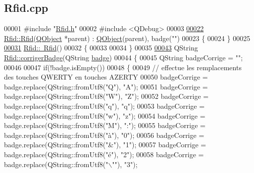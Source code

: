 \hypertarget{_rfid_8cpp_source}{}\subsection{Rfid.\+cpp}
\label{_rfid_8cpp_source}

\begin{DoxyCode}
00001 \textcolor{preprocessor}{#include "\hyperlink{_rfid_8h}{Rfid.h}"}
00002 \textcolor{preprocessor}{#include <QDebug>}
00003 
\hyperlink{class_rfid_aa00c7163ce0e3fda6596353d40a458a9}{00022} \hyperlink{class_rfid_aa00c7163ce0e3fda6596353d40a458a9}{Rfid::Rfid}(\hyperlink{class_q_object}{QObject} *parent) : \hyperlink{class_q_object}{QObject}(parent), badge(\textcolor{stringliteral}{""})
00023 \{
00024 \}
00025 
\hyperlink{class_rfid_a563836053a71a9fdc566a812da0cf5c1}{00031} \hyperlink{class_rfid_a563836053a71a9fdc566a812da0cf5c1}{Rfid::~Rfid}()
00032 \{
00033 
00034 \}
00035 
\hyperlink{class_rfid_afb99366646ac75b7e1d28302d38bf4f2}{00043} QString \hyperlink{class_rfid_afb99366646ac75b7e1d28302d38bf4f2}{Rfid::corrigerBadge}(QString \hyperlink{class_rfid_ac634cd26ffbe1c6da3967dc4af53b734}{badge})
00044 \{
00045     QString badgeCorrige = \textcolor{stringliteral}{""};
00046 
00047     \textcolor{keywordflow}{if}(!badge.isEmpty())
00048     \{
00049         \textcolor{comment}{// effectue les remplacements des touches QWERTY en touches AZERTY}
00050         badgeCorrige = badge.replace(QString::fromUtf8(\textcolor{stringliteral}{"Q"}), \textcolor{stringliteral}{"A"});
00051         badgeCorrige = badge.replace(QString::fromUtf8(\textcolor{stringliteral}{"W"}), \textcolor{stringliteral}{"Z"});
00052         badgeCorrige = badge.replace(QString::fromUtf8(\textcolor{stringliteral}{"q"}), \textcolor{stringliteral}{"q"});
00053         badgeCorrige = badge.replace(QString::fromUtf8(\textcolor{stringliteral}{"w"}), \textcolor{stringliteral}{"z"});
00054         badgeCorrige = badge.replace(QString::fromUtf8(\textcolor{stringliteral}{"M"}), \textcolor{stringliteral}{":"});
00055         badgeCorrige = badge.replace(QString::fromUtf8(\textcolor{stringliteral}{"à"}), \textcolor{stringliteral}{"0"});
00056         badgeCorrige = badge.replace(QString::fromUtf8(\textcolor{stringliteral}{"&"}), \textcolor{stringliteral}{"1"});
00057         badgeCorrige = badge.replace(QString::fromUtf8(\textcolor{stringliteral}{"é"}), \textcolor{stringliteral}{"2"});
00058         badgeCorrige = badge.replace(QString::fromUtf8(\textcolor{stringliteral}{"\(\backslash\)""}), \textcolor{stringliteral}{"3"});

\end{DoxyCode}
